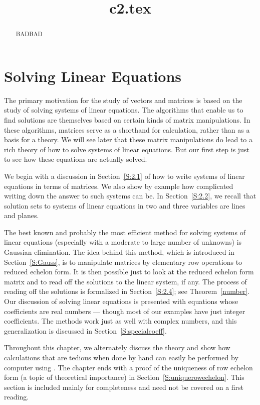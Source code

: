 \documentclass{ximera}
\title{c2.tex}
\begin{document}
\begin{abstract}
BADBAD
\end{abstract}
\maketitle

\chapter{Solving Linear Equations} \label{lineq}

\normalsize

The primary motivation for the study of vectors and matrices is based
on the study of solving systems of linear equations.  The algorithms
that enable us to find solutions are themselves based on certain kinds
of matrix manipulations.  In these algorithms, matrices serve as a
shorthand for calculation, rather than as a basis for a theory.  We will
see later that these matrix manipulations do lead to a rich theory of how
to solve systems of linear equations.  But our first step is just to see
how these equations are actually solved.

We begin with a discussion in Section~\ref{S:2.1} of how to write systems
of linear equations in terms of matrices.  We also show by example how
complicated writing down the answer to such systems can be.  In
Section~\ref{S:2.2}, we recall that solution sets to systems of linear
equations in two and three variables are lines and planes.

The best known and probably the most efficient method for solving
systems of linear equations (especially with a moderate to large number
of unknowns) is Gaussian elimination.  The idea behind this method,
which is introduced in Section~\ref{S:Gauss}, is to manipulate matrices
by elementary row operations to reduced echelon form.  It is then possible
just to look at the reduced echelon form matrix and to read off the
solutions to the linear system, if any.  The process of reading off the
solutions is formalized in Section~\ref{S:2.4}; see Theorem~\ref{number}.
Our discussion of solving linear equations is presented with equations
whose coefficients are real numbers --- though most of our examples have
just integer coefficients.  The methods work just as well with complex
numbers, and this generalization is discussed in Section~\ref{S:specialcoeff}.

Throughout this chapter, we alternately discuss the theory and show how
calculations that are tedious when done by hand can easily be performed
by computer using \Matlabp.  The chapter ends with a proof of the
uniqueness of row echelon form (a topic of theoretical importance) in
Section~\ref{S:uniquerowechelon}.  This section is included mainly for
completeness and need not be covered on a first reading.
\end{document}
